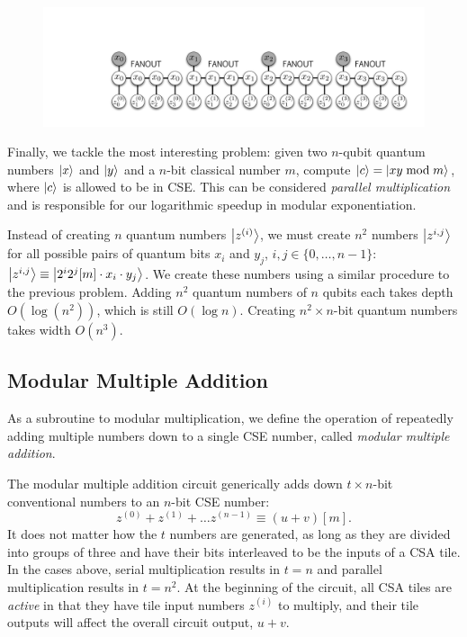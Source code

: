 \documentclass[twoside]{article}
\begin{document}
\begin{figure}[htp!]
\centerline{
\includegraphics[width=4.5in]{./znumbers.pdf}
}
\label{fig:mod-mult-create}
\end{figure}

Finally, we tackle the most interesting problem:
given two $n$-qubit quantum numbers $\left\vert{x}\right\rangle$ and
$\left\vert{y}\right\rangle$ and a $n$-bit classical number
$m$,
compute $\left\vert{c}\right\rangle = \left\vert{xy \bmod m}\right\rangle$,
where $\left\vert{c}\right\rangle$ is allowed to be in CSE.
This can be considered \emph{parallel multiplication} and is responsible
for our logarithmic speedup in modular exponentiation.

Instead of creating $n$ quantum numbers $\left\vert{z^{(i)}}\right\rangle$, we must create
$n^2$ numbers
$\left\vert{z^{i,j}}\right\rangle$ for all possible pairs of quantum bits $x_i$ and $y_j$,
$i,j \in \{0,\ldots,n-1\}$:
$\left\vert{z^{i,j}}\right\rangle \equiv \left\vert{2^i2^j[m]\cdot x_i \cdot y_j}\right\rangle$.
We create these numbers using a similar procedure to the previous problem.
Adding $n^2$ quantum numbers of $n$ qubits each takes depth
$O(\log(n^2))$, which is still $O(\log n)$.
Creating $n^2\times n$-bit quantum numbers takes width $O(n^3)$.

\subsection{Modular Multiple Addition}
\label{subsec:mma}

As a subroutine to modular multiplication, we define the operation of
repeatedly adding multiple numbers down to a single CSE number, called
\emph{modular multiple addition}.

The modular multiple addition circuit generically adds down $t\times n$-bit
conventional numbers to an $n$-bit CSE number:
%
\begin{equation}
z^{(0)} + z^{(1)} + \ldots z^{(n-1)} \equiv (u+v)[m].
\end{equation}
%
It does not matter how the
$t$ numbers are generated, as long as they are divided into groups of three
and have their bits interleaved to be the inputs of a CSA tile.
In the cases above, serial multiplication results in
$t = n$ and parallel multiplication results in $t = n^2$.
At the beginning of the circuit, all CSA tiles are
\emph{active} in that they have tile input numbers $z^{(i)}$
to multiply, and their tile outputs will affect the overall circuit output,
$u+v$.
\end{document}
